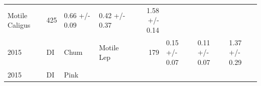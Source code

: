 \documentclass[fleqn,10pt]{wlpeerj} %
\begin{document}
\begin{longtable}[]{@{}llllrlll@{}}
\begin{minipage}[t]{0.11\columnwidth}
Motile Caligus\strut
\end{minipage} & \begin{minipage}[t]{0.04\columnwidth}\raggedleft\strut
425\strut
\end{minipage} & \begin{minipage}[t]{0.14\columnwidth}\raggedright\strut
0.66 +/- 0.09\strut
\end{minipage} & \begin{minipage}[t]{0.14\columnwidth}\raggedright\strut
0.42 +/- 0.37\strut
\end{minipage} & \begin{minipage}[t]{0.14\columnwidth}\raggedright\strut
1.58 +/- 0.14\strut
\end{minipage}\tabularnewline
\begin{minipage}[t]{0.09\columnwidth}\raggedright\strut
2015\strut
\end{minipage} & \begin{minipage}[t]{0.06\columnwidth}\raggedright\strut
DI\strut
\end{minipage} & \begin{minipage}[t]{0.06\columnwidth}\raggedright\strut
Chum\strut
\end{minipage} & \begin{minipage}[t]{0.11\columnwidth}\raggedright\strut
Motile Lep\strut
\end{minipage} & \begin{minipage}[t]{0.04\columnwidth}\raggedleft\strut
179\strut
\end{minipage} & \begin{minipage}[t]{0.14\columnwidth}\raggedright\strut
0.15 +/- 0.07\strut
\end{minipage} & \begin{minipage}[t]{0.14\columnwidth}\raggedright\strut
0.11 +/- 0.07\strut
\end{minipage} & \begin{minipage}[t]{0.14\columnwidth}\raggedright\strut
1.37 +/- 0.29\strut
\end{minipage}\tabularnewline
\begin{minipage}[t]{0.09\columnwidth}\raggedright\strut
2015\strut
\end{minipage} & \begin{minipage}[t]{0.06\columnwidth}\raggedright\strut
DI\strut
\end{minipage} & \begin{minipage}[t]{0.06\columnwidth}\raggedright\strut
Pink\strut
\end{minipage} & \begin{minipage}[t]{0.11\columnwidth}\raggedright\strut

\end{minipage}
\end{longtable}
\end{document}
